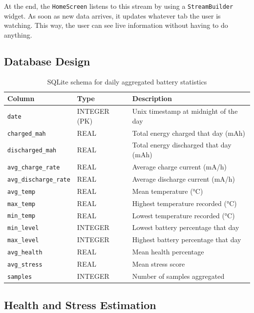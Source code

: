 \documentclass[12pt,a4paper]{report}
\begin{document}
At the end, the \texttt{HomeScreen} listens to this stream by using a \texttt{StreamBuilder} widget. As soon as new data arrives, it updates whatever tab the user is watching. This way, the user can see live information without having to do anything.

\subsection{Database Design}

\begin{table}[H]
\caption{SQLite schema for daily aggregated battery statistics}
\centering
\small
\begin{tabular}{lll}
\toprule
\textbf{Column} & \textbf{Type} & \textbf{Description}\\
\midrule
\texttt{date}             & INTEGER (PK) & Unix timestamp at midnight of the day\\
\texttt{charged\_mah}     & REAL & Total energy charged that day (mAh)\\
\texttt{discharged\_mah}  & REAL & Total energy discharged that day (mAh)\\
\texttt{avg\_charge\_rate}& REAL & Average charge current (mA/h)\\
\texttt{avg\_discharge\_rate} & REAL & Average discharge current (mA/h)\\
\texttt{avg\_temp}        & REAL & Mean temperature (°C)\\
\texttt{max\_temp}        & REAL & Highest temperature recorded (°C)\\
\texttt{min\_temp}        & REAL & Lowest temperature recorded (°C)\\
\texttt{min\_level}       & INTEGER & Lowest battery percentage that day\\
\texttt{max\_level}       & INTEGER & Highest battery percentage that day\\
\texttt{avg\_health}      & REAL & Mean health percentage\\
\texttt{avg\_stress}      & REAL & Mean stress score\\
\texttt{samples}          & INTEGER & Number of samples aggregated\\
\bottomrule
\end{tabular}
\end{table}

\subsection{Health and Stress Estimation}
\end{document}
